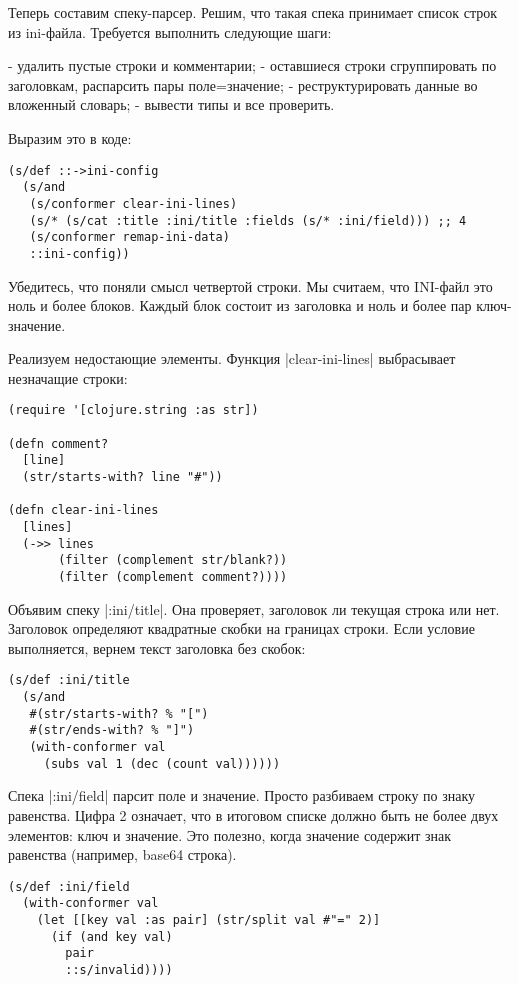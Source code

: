 Теперь составим спеку-парсер. Решим, что такая спека принимает список строк из
ini-файла. Требуется выполнить следующие шаги:

- удалить пустые строки и комментарии;
- оставшиеся строки сгруппировать по заголовкам, распарсить пары поле=значение;
- реструктурировать данные во вложенный словарь;
- вывести типы и все проверить.

Выразим это в коде:

\begin{verbatim}
(s/def ::->ini-config
  (s/and
   (s/conformer clear-ini-lines)
   (s/* (s/cat :title :ini/title :fields (s/* :ini/field))) ;; 4
   (s/conformer remap-ini-data)
   ::ini-config))
\end{verbatim}

Убедитесь, что поняли смысл четвертой строки. Мы считаем, что INI-файл это ноль
и более блоков. Каждый блок состоит из заголовка и ноль и более пар
ключ-значение.

Реализуем недостающие элементы. Функция \spverb|clear-ini-lines| выбрасывает незначащие
строки:

\begin{verbatim}
(require '[clojure.string :as str])

(defn comment?
  [line]
  (str/starts-with? line "#"))

(defn clear-ini-lines
  [lines]
  (->> lines
       (filter (complement str/blank?))
       (filter (complement comment?))))
\end{verbatim}

Объявим спеку \spverb|:ini/title|. Она проверяет, заголовок ли текущая строка или
нет. Заголовок определяют квадратные скобки на границах строки. Если условие
выполняется, вернем текст заголовка без скобок:

\begin{verbatim}
(s/def :ini/title
  (s/and
   #(str/starts-with? % "[")
   #(str/ends-with? % "]")
   (with-conformer val
     (subs val 1 (dec (count val))))))
\end{verbatim}

Спека \spverb|:ini/field| парсит поле и значение. Просто разбиваем строку по знаку
равенства. Цифра 2 означает, что в итоговом списке должно быть не более двух
элементов: ключ и значение. Это полезно, когда значение содержит знак равенства
(например, base64 строка).

\begin{verbatim}
(s/def :ini/field
  (with-conformer val
    (let [[key val :as pair] (str/split val #"=" 2)]
      (if (and key val)
        pair
        ::s/invalid))))
\end{verbatim}

